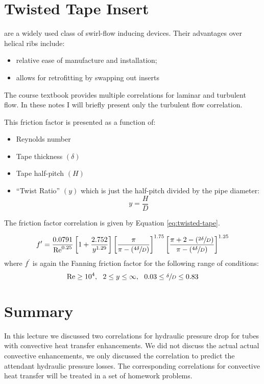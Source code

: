 \section{Twisted Tape Insert} 
 are a widely used class of swirl-flow inducing devices.  Their advantages over helical ribs include:
\begin{itemize}
\item relative ease of manufacture and installation;
\item allows for retrofitting by swapping out inserts
\end{itemize}
The course textbook provides multiple correlations for laminar and turbulent flow.  In these notes I will briefly present only the turbulent flow correlation.\cite{manglik1993heat}

This friction factor is presented as a function of:

\begin{itemize}
\item Reynolds number
\item Tape thickness $(\delta)$
\item Tape half-pitch $(H)$
\item ``Twist Ratio'' $(y)$ which is just the half-pitch divided by the pipe diameter:
$$y = \frac{H}{D}$$
\end{itemize}

The friction factor correlation is given by Equation \ref{eq:twisted-tape}.

\begin{equation}
f^{\prime}=\frac{0.0791}{\text{Re}^{0.25}}\left[1+\frac{2.752}{y^{1.29}} \right]\left[\frac{\pi}{\pi - \left(\sfrac{4 \delta}{D} \right)} \right]^{1.75} \left[\frac{\pi +2 - \left(\sfrac{2\delta}{D} \right)}{\pi - \left(\sfrac{4 \delta}{D} \right)} \right]^{1.25}
\label{eq:twisted-tape}
\end{equation}
where $f^{\prime}$ is again the Fanning friction factor for the following range of conditions:
$$ \text{Re} \ge 10^4, \ \ 2 \le y \le \infty, \ \ 0.03 \le \sfrac{\delta}{D} \le 0.83$$

\section{Summary}
In this lecture we discussed two correlations for hydraulic pressure drop for tubes with convective heat transfer enhancements.  We did not discuss the actual actual convective enhancements, we only discussed the correlation to predict the attendant hydraulic pressure losses.  The corresponding correlations for convective heat transfer will be treated in a set of homework problems.
